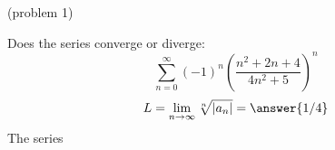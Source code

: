 \documentclass{ximera}
\begin{document}
\begin{problem}(problem 1)

Does the series converge or diverge:
\[
\sum_{n=0}^\infty (-1)^n\left(\frac{n^2 + 2n+ 4}{4n^2 + 5}\right)^n
\]
\[
L = \lim_{n \to \infty} \sqrt[n]{\left|{a_n}\right|}= \answer{1/4}
\]
The series 
\end{problem}

\begin{center}
\begin{foldable}
\end{foldable}
\end{center}
\end{document}
